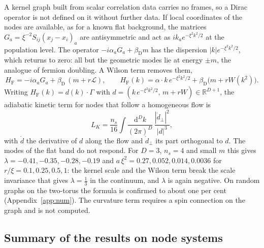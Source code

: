 \documentclass[11pt,a4paper]{article}
\theoremstyle{stmt}
\theoremstyle{defn}
\theoremstyle{rmk}
\numberwithin{equation}{section}
\newcommand{\Lc}{\mathcal{L}}
\newcommand{\R}{\mathbb{R}}
\newcommand{\dd}{\mathrm{d}}
\begin{document}
A kernel graph built from scalar correlation data carries no frames, so a Dirac operator is not defined on it without further data. If local coordinates of the nodes are available, as for a known flat background, the matrices $G_a=\xi^{-2}S_{ij}(x_j-x_i)_a$ are antisymmetric and act as $ik_ae^{-\xi^2k^2/2}$ at the population level. The operator $-i\alpha_aG_a+\beta_{\mathrm D}m$ has the dispersion $|k|e^{-\xi^2k^2/2}$, which returns to zero: all but the geometric modes lie at energy $\pm m$, the analogue of fermion doubling. A Wilson term removes them,
\begin{equation}\label{eq:wilson}
H_{\mathrm F}=-i\alpha_aG_a+\beta_{\mathrm D}\,(m+r\Lc),\qquad H_{\mathrm F}(k)=\alpha\!\cdot\!k\,e^{-\xi^2k^2/2}+\beta_{\mathrm D}\big(m+rW(k^2)\big).
\end{equation}
Writing $H_{\mathrm F}(k)=d(k)\cdot\Gamma$ with $d=(k\,e^{-\xi^2k^2/2},\,m+rW)\in\R^{D+1}$, the adiabatic kinetic term for nodes that follow a homogeneous flow is
\begin{equation}\label{eq:wilsonLK}
L_K=\frac{n_s}{16}\int\frac{\dd^Dk}{(2\pi)^D}\,\frac{|\dot d_\perp|^2}{|d|^3},
\end{equation}
with $\dot d$ the derivative of $d$ along the flow and $\dot d_\perp$ its part orthogonal to $d$. The modes of the flat band do not respond. For $D=3$, $n_s=4$ and small $m$ this gives $\lambda=-0.41,-0.35,-0.28,-0.19$ and $a\,\xi^2=0.27,0.052,0.014,0.0036$ for $r/\xi=0.1,0.25,0.5,1$: the kernel scale and the Wilson term break the scale invariance that gives $\lambda=\tfrac13$ in the continuum, and $\lambda$ is again negative. On random graphs on the two-torus the formula is confirmed to about one per cent (Appendix~\ref{app:num}). The curvature term requires a spin connection on the graph and is not computed.

\subsection{Summary of the results on node systems}\label{sec:nodesummary}
\end{document}
